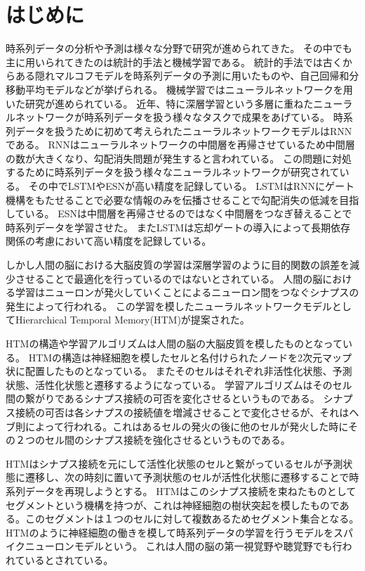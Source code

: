 \chapter{はじめに}
時系列データの分析や予測は様々な分野で研究が進められてきた。
その中でも主に用いられてきたのは統計的手法と機械学習である。
統計的手法では古くからある隠れマルコフモデル\cite{hmm_original}を時系列データの予測に用いたもの\cite{hmm}や、自己回帰和分移動平均モデル\cite{arima}などが挙げられる。
機械学習ではニューラルネットワークを用いた研究が進められている。
近年、特に深層学習という多層に重ねたニューラルネットワークが時系列データを扱う様々なタスクで成果をあげている。
時系列データを扱うために初めて考えられたニューラルネットワークモデルはRNN\cite{rnn}である。
RNNはニューラルネットワークの中間層を再帰させているため中間層の数が大きくなり、勾配消失問題が発生すると言われている。
この問題に対処するために時系列データを扱う様々なニューラルネットワークが研究されている。
その中でLSTM\cite{lstm_original}やESN\cite{esn}が高い精度を記録している。
LSTMはRNNにゲート機構をもたせることで必要な情報のみを伝播させることで勾配消失の低減を目指している。
ESNは中間層を再帰させるのではなく中間層をつなぎ替えることで時系列データを学習させた。
またLSTMは忘却ゲートの導入\cite{lstm_forget_gate}によって長期依存関係の考慮において高い精度を記録している。

しかし人間の脳における大脳皮質の学習は深層学習のように目的関数の誤差を減少させることで最適化を行っているのではないとされている\cite{neurons}。
人間の脳における学習はニューロンが発火していくことによるニューロン間をつなぐシナプスの発生によって行われる。
この学習を模したニューラルネットワークモデルとしてHierarchical Temporal Memory(HTM)が提案された。\cite{htm}

HTMの構造や学習アルゴリズムは人間の脳の大脳皮質を模したものとなっている。
HTMの構造は神経細胞を模したセルと名付けられたノードを2次元マップ状に配置したものとなっている。
またそのセルはそれぞれ非活性化状態、予測状態、活性化状態と遷移するようになっている。
学習アルゴリズムはそのセル間の繋がりであるシナプス接続の可否を変化させるというものである。
シナプス接続の可否は各シナプスの接続値を増減させることで変化させるが、それはヘブ則によって行われる。これはあるセルの発火の後に他のセルが発火した時にその２つのセル間のシナプス接続を強化させるというものである。

HTMはシナプス接続を元にして活性化状態のセルと繋がっているセルが予測状態に遷移し、次の時刻に置いて予測状態のセルが活性化状態に遷移することで時系列データを再現しようとする。
HTMはこのシナプス接続を束ねたものとしてセグメントという機構を持つが、これは神経細胞の樹状突起を模したものである。このセグメントは１つのセルに対して複数あるためセグメント集合となる。
HTMのように神経細胞の働きを模して時系列データの学習を行うモデルをスパイクニューロンモデル\cite{spike_neuron}という。
これは人間の脳の第一視覚野や聴覚野でも行われているとされている。\cite{brain_seq}

